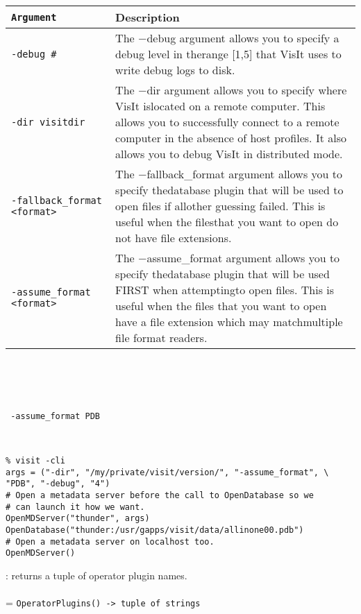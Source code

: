 \documentclass[10pt,a4paper]{report}
\begin{document}
\begin{tabular}{|l|p{9cm}|}
\hline
\verb!Argument! & Description \\
\hline \hline
\verb!-debug #! & The $-$debug argument allows you to specify a debug level in therange [1,5] that VisIt uses to write debug logs to disk. \\
\verb!-dir visitdir! & The $-$dir argument allows you to specify where VisIt islocated on a remote computer. This allows you to successfully connect to a remote computer in the absence of host profiles. It also allows you to debug VisIt in distributed mode. \\
\verb!-fallback_format <format>! & The $-$fallback\_format argument allows you to specify thedatabase plugin that will be used to open files if allother guessing failed. This is useful when the filesthat you want to open do not have file extensions. \\
\verb!-assume_format <format>! & The $-$assume\_format argument allows you to specify thedatabase plugin that will be used FIRST when attemptingto open files. This is useful when the files that you want to open have a file extension which may matchmultiple file format readers. \\
\hline
\end{tabular} \\[-2mm]
\\[-3mm] 

\\[-6mm]
\begin{verbatim} -assume_format PDB
\end{verbatim}
\\[-6mm]
\begin{verbatim}% visit -cli
args = ("-dir", "/my/private/visit/version/", "-assume_format", \
"PDB", "-debug", "4")
# Open a metadata server before the call to OpenDatabase so we 
# can launch it how we want.
OpenMDServer("thunder", args)
OpenDatabase("thunder:/usr/gapps/visit/data/allinone00.pdb")
# Open a metadata server on localhost too.
OpenMDServer()
\end{verbatim}
\newpage


{}
: returns a tuple of operator plugin names.\\[-3mm]

 \\ 
\hangindent=\parindent 
\verb!OperatorPlugins() -> tuple of strings!\\ [-3mm]
\end{document}
